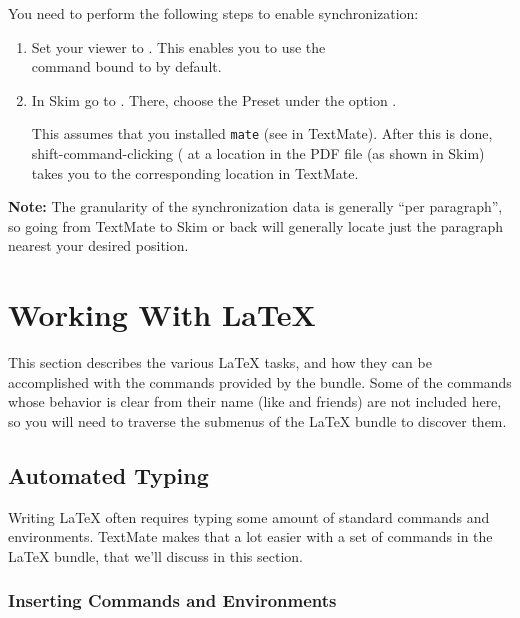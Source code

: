 \documentclass[11pt, x11names]{article}
\begin{document}
You need to perform the following steps to enable synchronization:

\begin{enumerate}

    \item Set your viewer to . This enables you to use the\\ command bound to  by default.

    \item In Skim go to . There, choose the Preset  under the option .

    This assumes that you installed \texttt{mate} (see  in TextMate). After this is done, shift-command-clicking (\keys{\shift + \cmd} at a location in the PDF file (as shown in Skim) takes you to the corresponding location in TextMate.

\end{enumerate}

\textbf{Note:} The granularity of the synchronization data is generally “per paragraph”, so going from TextMate to Skim or back will generally locate just the paragraph nearest your desired position.

\section{Working With LaTeX}

This section describes the various LaTeX tasks, and how they can be accomplished with the commands provided by the bundle. Some of the commands whose behavior is clear from their name (like  and friends) are not included here, so you will need to traverse the submenus of the LaTeX bundle to discover them.

\subsection{Automated Typing}

Writing LaTeX often requires typing some amount of standard commands and environments. TextMate makes that a lot easier with a set of commands in the LaTeX bundle, that we'll discuss in this section.

\subsubsection{Inserting Commands and
Environments}
\end{document}
